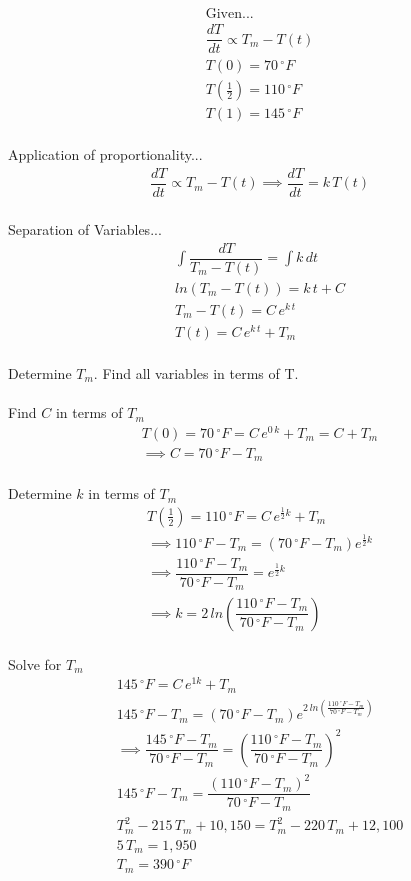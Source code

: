 \documentclass{article}
\begin{document}
\begin{gather*}
\text{Given...}\\
\dfrac{dT}{dt}\propto T_m-T(t)\\
T(0)=70\,^{\circ}F\\
T(\frac{1}{2})=110\,^{\circ}F\\
T(1)=145\,^{\circ}F\\
\end{gather*}

\noindent Application of proportionality...\\
\begin{gather*}
\dfrac{dT}{dt}\propto T_m-T(t)\implies\dfrac{dT}{dt}=k\,T(t)\\
\end{gather*}

\noindent Separation of Variables...\\
\begin{gather*}
\int \dfrac{dT}{T_m-T(t)}=\int k\,dt\\
ln(T_m-T(t))=k\,t+C\\
T_m-T(t)=C\,e^{k\,t}\\
T(t)=C\,e^{k\,t}+T_m\\
\end{gather*}

\noindent Determine $T_m$. Find all variables in terms of T.\\\\
Find $C$ in terms of $T_m$\\
\begin{gather*}
T(0)=70\,^{\circ}F=C\,e^{0\,k}+T_m=C+T_m\\
\implies C=70\,^{\circ}F-T_m\\
\end{gather*}

\noindent Determine $k$ in terms of $T_m$\\
\begin{gather*}
T(\frac{1}{2})=110\,^{\circ}F=C\,e^{\frac{1}{2}k}+T_m\\
\implies 110\,^{\circ}F-T_m=(70\,^{\circ}F-T_m)e^{\frac{1}{2}k}\\
\implies \dfrac{110\,^{\circ}F-T_m}{70\,^{\circ}F-T_m}=e^{\frac{1}{2}k}\\
\implies k=2\,ln(\dfrac{110\,^{\circ}F-T_m}{70\,^{\circ}F-T_m})\\
\end{gather*}

\noindent Solve for $T_m$\\
\begin{gather*}
145\,^{\circ}F=C\,e^{1k}+T_m\\
145\,^{\circ}F-T_m=(70\,^{\circ}F-T_m)e^{2\,ln(\frac{110\,^{\circ}F-T_m}{70\,^{\circ}F-T_m})}\\
\implies\dfrac{145\,^{\circ}F-T_m}{70\,^{\circ}F-T_m}=(\dfrac{110\,^{\circ}F-T_m}{70\,^{\circ}F-T_m})^2\\
145\,^{\circ}F-T_m=\dfrac{(110\,^{\circ}F-T_m)^2}{70\,^{\circ}F-T_m}\\
T_m^2-215\,T_m+10,150=T_m^2-220\,T_m+12,100\\
5\,T_m=1,950\\
T_m=390\,^{\circ}F
\end{gather*}
\end{document}
